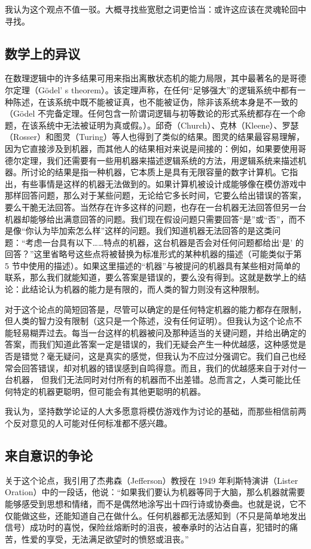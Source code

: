 \documentclass[12pt,a4paper,twoside]{article}
\begin{document}
我认为这个观点不值一驳。大概寻找些宽慰之词更恰当：或许这应该在灵魂轮回中寻找。

\subsection{数学上的异议}
在数理逻辑中的许多结果可用来指出离散状态机的能力局限，其中最著名的是哥德尔定理（Gödel’ s theorem）。该定理声称，在任何“足够强大”的逻辑系统中都有一种陈述，在该系统中既不能被证真，也不能被证伪，除非该系统本身是不一致的（Gödel 不完备定理。任何包含一阶谓词逻辑与初等数论的形式系统都存在一个命题，在该系统中无法被证明为真或假。）。邱奇（Church）、克林（Kleene）、罗瑟（Rosser）和图灵（Turing）等人也得到了类似的结果。图灵的结果最容易理解，因为它直接涉及到机器，而其他人的结果相对来说是间接的：例如，如果要使用哥德尔定理，我们还需要有一些用机器来描述逻辑系统的方法，用逻辑系统来描述机器。所讨论的结果是指一种机器，它本质上是具有无限容量的数字计算机。它指出，有些事情是这样的机器无法做到的。如果计算机被设计成能够像在模仿游戏中那样回答问题，那么对于某些问题，无论给它多长时间，它要么给出错误的答案，要么干脆无法回答。当然存在许多这样的问题，也存在一台机器无法回答但另一台机器却能够给出满意回答的问题。我们现在假设问题只需要回答“是”或“否”，而不是像“你认为毕加索怎么样”这样的问题。我们知道机器无法回答的是这类问题：“考虑一台具有以下……特点的机器，这台机器是否会对任何问题都给出‘是’ 的回答？”这里省略号这些点将被替换为标准形式的某种机器的描述（可能类似于第 5 节中使用的描述）。如果这里描述的“机器”与被提问的机器具有某些相对简单的联系，那么我们就能知道，要么答案是错误的，要么没有得到。这就是数学上的结论：此结论认为机器的能力是有限的，而人类的智力则没有这种限制。 

对于这个论点的简短回答是，尽管可以确定的是任何特定机器的能力都存在限制，但人类的智力没有限制（这只是一个陈述，没有任何证明）。但我认为这个论点不能轻易糊弄过去。每当一台这样的机器被问及那种适当的关键问题，并给出确定的答案，而我们知道此答案一定是错误的，我们无疑会产生一种优越感，这种感觉是否是错觉？毫无疑问，这是真实的感觉，但我认为不应过分强调它。我们自己也经常会回答错误，却对机器的错误感到自鸣得意。而且，我们的优越感来自于对付一台机器， 但我们无法同时对付所有的机器而不出差错。总而言之，人类可能比任何特定的机器更聪明，但可能会有其他更聪明的机器。

我认为，坚持数学论证的人大多愿意将模仿游戏作为讨论的基础，而那些相信前两个反对意见的人可能对任何标准都不感兴趣。

\subsection{来自意识的争论}
关于这个论点，我引用了杰弗森（Jefferson）教授在 1949 年利斯特演讲（Lister Oration）中的一段话，他说：“如果我们要认为机器等同于大脑，那么机器就需要能够感受到思想和情绪，而不是偶然地涂写出十四行诗或协奏曲。也就是说，它不仅能做这些，还能知道自己在做什么。任何机器都无法感知到（不只是简单地发出信号）成功时的喜悦，保险丝熔断时的沮丧，被奉承时的沾沾自喜，犯错时的痛苦，性爱的享受，无法满足欲望时的愤怒或沮丧。”
\end{document}
